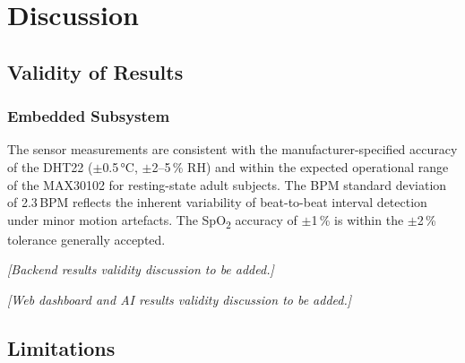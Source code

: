 
\chapter{Discussion}
\label{ch:discussion}

\section{Validity of Results}

\subsection{Embedded Subsystem}

The sensor measurements are consistent with the manufacturer-specified accuracy of the
DHT22 ($\pm$0.5\,°C, $\pm$2--5\,\% RH) and within the expected operational range of
the MAX30102 for resting-state adult subjects.
The BPM standard deviation of 2.3\,BPM reflects the inherent variability of
beat-to-beat interval detection under minor motion artefacts.
The SpO\textsubscript{2} accuracy of $\pm$1\,\% is within the $\pm$2\,\% tolerance
generally accepted.

\begin{center}
	\textit{[Backend results validity discussion to be added.]}
\end{center}

\begin{center}
	\textit{[Web dashboard and AI results validity discussion to be added.]}
\end{center}

\section{Limitations}

